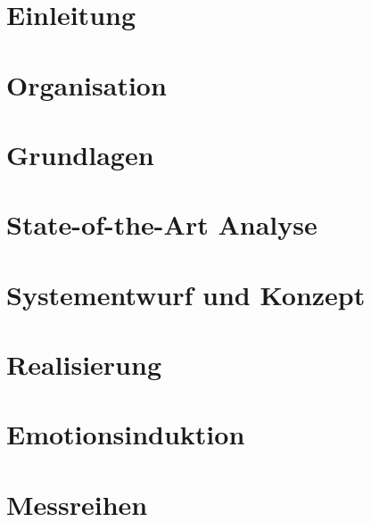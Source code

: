 \documentclass[a4paper,11pt]{article}
\begin{document}



\newpage
\renewcommand{\contentsname}{Inhaltsverzeichnis}
\tableofcontents
\clearpage


\newpage



\newpage
\section{Einleitung} \label{einleitung-sec}



\newpage
\section{Organisation} \label{organisation-sec}



\newpage
\section{Grundlagen} \label{grundlagen-sec}



\newpage
\section{State-of-the-Art Analyse} \label{soa-sec}



\newpage
\section{Systementwurf und Konzept} \label{systementwurf-sec}



\newpage
\section{Realisierung} \label{realisierung-sec}



\newpage
\section{Emotionsinduktion} \label{emotionsinduktion-sec}



\newpage
\section{Messreihen} \label{messreihen-sec}

\end{document}
